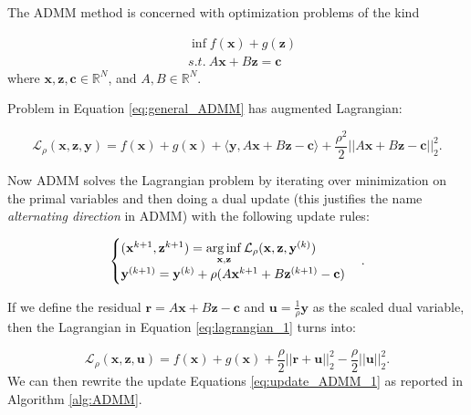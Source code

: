 The ADMM method is concerned with optimization problems of the kind

\begin{equation}\label{eq:general_ADMM}
\begin{aligned}
& \inf f(\mathbf x)+g(\mathbf z) \\
& s.t.\ A\mathbf x+B\mathbf z=\mathbf c
\end{aligned}
\end{equation}
where $\mathbf x,\mathbf z,\mathbf c\in\mathbb R^N$, and $A,B\in\mathbb R^N$.

Problem in Equation \eqref{eq:general_ADMM} has augmented Lagrangian:

\begin{equation}\label{eq:lagrangian_1}
\mathcal L_\rho(\mathbf x,\mathbf z,\mathbf y )=f(\mathbf x)+g(\mathbf x) + \langle\mathbf y,A\mathbf x+B\mathbf z-\mathbf c\rangle +\frac{\rho^2}{2}||A\mathbf x+B\mathbf z-\mathbf c||_2^2.
\end{equation}

Now ADMM solves the Lagrangian problem by iterating over minimization on the primal variables and then doing a dual update (this justifies the name \emph{alternating direction} in ADMM) with the following update rules:

\begin{equation}\label{eq:update_ADMM_1}
\begin{cases}
(\mathbf x^{k+1},\mathbf z^{k+1})=\operatorname*{arg\,inf}\limits_{\mathbf x,\mathbf z }\mathcal L_\rho(\mathbf x,\mathbf z,\mathbf y^{(k)})\\
\mathbf y^{(k+1)}=\mathbf y^{(k)}+\rho(A\mathbf x^{k+1}+B\mathbf z^{(k+1)}-\mathbf c)
\end{cases}.
\end{equation}

If we define the residual $\mathbf r=A\mathbf x+B\mathbf z-\mathbf c$ and $\mathbf u=\frac{1}{\rho}\mathbf y$ as the scaled dual variable, then the Lagrangian in Equation \eqref{eq:lagrangian_1} turns into:

\begin{equation}\label{eq:lagrangian_2}
\mathcal L_\rho(\mathbf x,\mathbf z,\mathbf u )=f(\mathbf x)+g(\mathbf x) + \frac{\rho}{2}||\mathbf r+\mathbf u||_2^2-\frac{\rho}{2}||\mathbf u||_2^2.
\end{equation}
We can then rewrite the update Equations \eqref{eq:update_ADMM_1} as reported in Algorithm \ref{alg:ADMM}.

